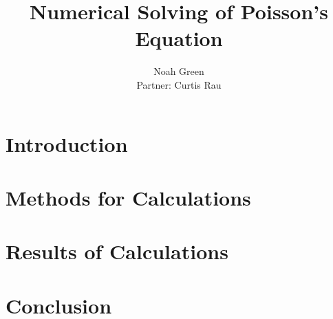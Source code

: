 \documentclass[a4paper,10pt]{report}
\title{Numerical Solving of Poisson's Equation}
\author{Noah Green \\ Partner: Curtis Rau}
\begin{document}
\maketitle

\begin{abstract}

\end{abstract}

\section{Introduction}


\section{Methods for Calculations}


\section{Results of Calculations}


\section{Conclusion}




\end{document}
